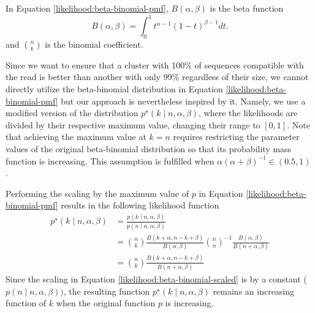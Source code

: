 \documentclass[officiallayout]{tktla}
\begin{document}
In Equation \ref{likelihood:beta-binomial-pmf}, $B\left(\alpha, \beta\right)$ is the beta function
\begin{equation}
  \label{likelihood:beta-function}
  B\left(\alpha, \beta\right) = \int_{0}^{1}t^{\alpha - 1}\left(1 - t\right)^{\beta - 1}dt.
\end{equation}
and $\binom{n}{k}$ is the binomial coefficient.

Since we want to ensure that a cluster with 100\% of sequences
compatible with the read is better than another with only 99\%
regardless of their size, we cannot directly utilize the beta-binomial
distribution in Equation \ref{likelihood:beta-binomial-pmf} but our
approach is nevertheless inspired by it. Namely, we use a modified
version of the distribution $p^{\star}\left(k \middle| n, \alpha,
\beta\right)$, where the likelihoods are divided by their respective
maximum value, changing their range to $\left[0, 1\right]$. Note that
achieving the maximum value at $k = n$ requires restricting the
parameter values of the original beta-binomial distribution so that
its probability mass function is increasing. This assumption is
fulfilled when $\alpha\left(\alpha + \beta\right)^{-1} \in \left(0.5,
1\right)$ \citep{berg1993condorcet}.

Performing the scaling by the maximum value of $p$ in Equation
\ref{likelihood:beta-binomial-pmf} results in the following likelihood
function
\begin{equation}
  \label{likelihood:beta-binomial-scaled}
  \begin{aligned}
    p^{\star}\left(k \middle| n, \alpha, \beta\right) &= \frac{p\left(k \middle| n, \alpha, \beta\right)}{p\left(n \middle| n, \alpha, \beta\right)} \\
    &= \binom{n}{k}\frac{B\left(k + \alpha, n - k + \beta\right)}{B\left(\alpha, \beta\right)} \binom{n}{n}^{-1}\frac{B\left(\alpha, \beta\right)}{B\left(n + \alpha, \beta\right)} \\
    &= \binom{n}{k}\frac{B\left(k + \alpha, n - k + \beta\right)}{B\left(n + \alpha, \beta\right)}
  \end{aligned}
\end{equation}
Since the scaling in Equation \ref{likelihood:beta-binomial-scaled} is
by a constant ($p\left(n \middle| n, \alpha, \beta\right))$, the
resulting function $p^{\star}\left(k \middle| n, \alpha, \beta\right)$
remains an increasing function of $k$ when the original function $p$
is increasing.
\end{document}
